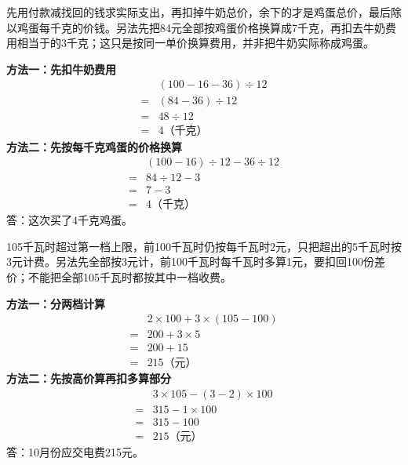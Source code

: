 \documentclass[multi=snippet,border=0pt]{standalone}
\newenvironment{snippet}[3]{\begin{minipage}{#1bp}\color{answerred}\fontsize{#2}{#3}\selectfont\raggedright}{\end{minipage}}
\begin{document}
\begin{snippet}{505}{11.5}{14}先用付款减找回的钱求实际支出，再扣掉牛奶总价，余下的才是鸡蛋总价，最后除以鸡蛋每千克的价钱。另法先把84元全部按鸡蛋价格换算成7千克，再扣去牛奶费用相当于的3千克；这只是按同一单价换算费用，并非把牛奶实际称成鸡蛋。\par \textbf{方法一：先扣牛奶费用}\[\begin{aligned} &(100-16-36)\div12\\={}&(84-36)\div12\\={}&48\div12\\={}&4\text{（千克）}\end{aligned}\]\textbf{方法二：先按每千克鸡蛋的价格换算}\[\begin{aligned} &(100-16)\div12-36\div12\\={}&84\div12-3\\={}&7-3\\={}&4\text{（千克）}\end{aligned}\]答：这次买了4千克鸡蛋。\end{snippet}
\begin{snippet}{505}{11.5}{14}105千瓦时超过第一档上限，前100千瓦时仍按每千瓦时2元，只把超出的5千瓦时按3元计费。另法先全部按3元计，前100千瓦时每千瓦时多算1元，要扣回100份差价；不能把全部105千瓦时都按其中一档收费。\par \textbf{方法一：分两档计算}\[\begin{aligned} &2\times100+3\times(105-100)\\={}&200+3\times5\\={}&200+15\\={}&215\text{（元）}\end{aligned}\]\textbf{方法二：先按高价算再扣多算部分}\[\begin{aligned} &3\times105-(3-2)\times100\\={}&315-1\times100\\={}&315-100\\={}&215\text{（元）}\end{aligned}\]答：10月份应交电费215元。\end{snippet}
\end{document}
